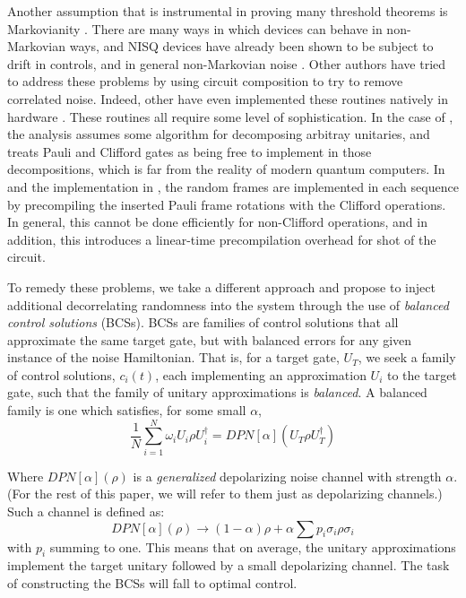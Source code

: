 \documentclass[aps,nofootinbib,pra,notitlepage,twocolumn]{revtex4-1}
\begin{document}
Another assumption that is instrumental in proving many threshold theorems is Markovianity \cite{Kitaev1997}. There are many ways in which devices can behave in non-Markovian ways, and NISQ devices have already been shown to be subject to drift in controls, \cite{Kelly2018} and in general non-Markovian noise \cite{BlumeKohout2017}. Other authors have tried to address these problems \cite{Wallman2016, Campbell2017, Heim2016} by using circuit composition to try to remove correlated noise. Indeed, other have even implemented these routines natively in hardware \cite{Ware2018}. These routines all require some level of sophistication. In the case of \cite{Campbell2017}, the analysis assumes some algorithm for decomposing arbitray unitaries, and treats Pauli and Clifford gates as being free to implement in those decompositions, which is far from the reality of modern quantum computers. In \cite{Wallman2016} and the implementation in \cite{Ware2018}, the random frames are implemented in each sequence by precompiling the inserted Pauli frame rotations with the Clifford operations. In general, this cannot be done efficiently for non-Clifford operations, and in addition, this introduces a linear-time precompilation overhead for shot of the circuit.

To remedy these problems, we take a different approach and propose to inject additional decorrelating randomness into the system through the use of \emph{balanced control solutions} (BCSs). BCSs are families of control solutions that all approximate the same target gate, but with balanced errors for any given instance of the noise Hamiltonian. That is, for a target gate, $U_T$, we seek a family of control solutions, $c_i(t)$, each implementing an approximation $U_i$ to the target gate, such that the family of unitary approximations is \emph{balanced}. A balanced family is one which satisfies, for some small $\alpha$,
\begin{equation}\label{eq:1}
  \frac{1}{N}\sum_{i=1}^N \omega_i U_i \rho U_i^\dagger = DPN[\alpha]\left(U_T \rho U_T^\dagger \right)
\end{equation}

Where $DPN[\alpha](\rho)$ is a \textit{generalized} depolarizing noise channel with strength $\alpha$. (For the rest of this paper, we will refer to them just as depolarizing channels.) Such a channel is defined as:
\begin{equation}\label{eq:2}
  DPN[\alpha](\rho) \rightarrow (1-\alpha)\rho + \alpha\sum p_i \sigma_i\rho\sigma_i
\end{equation}
with $p_i$ summing to one. This means that on average, the unitary approximations implement the target unitary followed by a small depolarizing channel. The task of constructing the BCSs will fall to optimal control.
\end{document}
